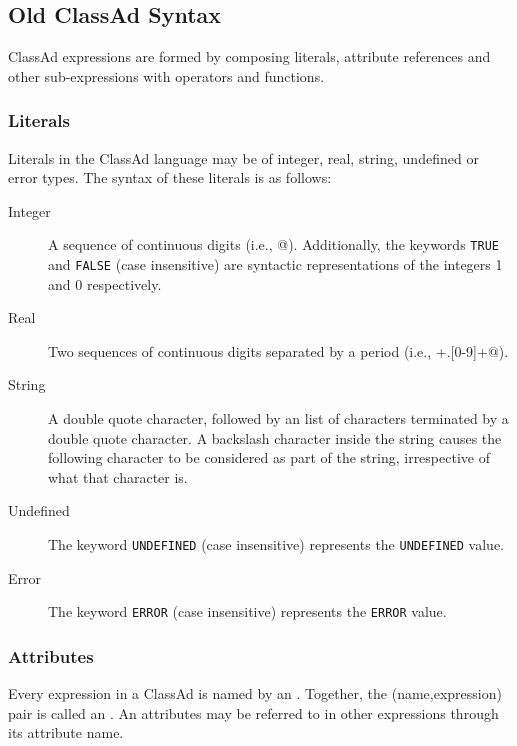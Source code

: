 \subsection{Old ClassAd Syntax}
ClassAd expressions are formed by composing literals, attribute references and 
other sub-expressions with operators and functions. 
\subsubsection{Literals}
\label{ClassAd:literals}
Literals in the ClassAd language may be of integer, real, string, undefined or 
error types.  The syntax of these literals is as follows:
\begin{description}
	\item[Integer]  A sequence of continuous digits (i.e., \verb@[0-9]@).
		Additionally, the keywords \verb+TRUE+ and \verb+FALSE+ (case
		insensitive) are syntactic representations of the integers 1 and 0 
		respectively.

	\item[Real] Two sequences of continuous digits separated by a period
		(i.e., \verb@[0-9]+.[0-9]+@).

	\item[String] A double quote character, followed by an list of characters
		terminated by a double quote character.  A backslash character inside
		the string causes the following character to be considered as part of
		the string, irrespective of what that character is.

	\item[Undefined] The keyword \texttt{UNDEFINED} (case insensitive)
		represents the \texttt{UNDEFINED} value.

	\item[Error] The keyword \texttt{ERROR} (case insensitive)
		represents the \texttt{ERROR} value.
\end{description}

\subsubsection{Attributes}
Every expression in a ClassAd is named by an .  Together,
the (name,expression) pair is called an .  An attributes may be
referred to in other expressions through its attribute name.

